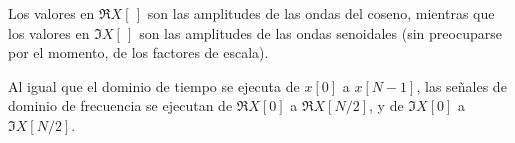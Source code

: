 \par
Los valores en $\Re X [ \, ]$ son las amplitudes de las ondas del coseno, mientras que los valores en $\Im X[ \, ]$ son las amplitudes de las ondas senoidales (sin preocuparse por el momento, de los factores de escala).
\par
Al igual que el dominio de tiempo se ejecuta de $x[0]$ a $x[N - 1]$, las señales de dominio de frecuencia se ejecutan de $\Re X[0]$ a $\Re X[N / 2]$, y de $\Im X[0]$ a $\Im X[N / 2]$. %

